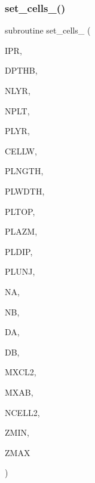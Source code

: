 \mbox{\label{Leroi__c_8f90_a34542cb94b24b37bf99b63f2e3e5e368}} 
\subsubsection{\texorpdfstring{set\+\_\+cells\+\_()}{set\_cells\_1()}}
{\footnotesize\ttfamily subroutine set\+\_\+cells\+\_ (\begin{DoxyParamCaption}\item[{integer}]{I\+PR,  }\item[{real}]{D\+P\+T\+HB,  }\item[{integer}]{N\+L\+YR,  }\item[{integer}]{N\+P\+LT,  }\item[{integer, dimension(nplt)}]{P\+L\+YR,  }\item[{real}]{C\+E\+L\+LW,  }\item[{real, dimension(nplt)}]{P\+L\+N\+G\+TH,  }\item[{real, dimension(nplt)}]{P\+L\+W\+D\+TH,  }\item[{real, dimension(nplt)}]{P\+L\+T\+OP,  }\item[{real, dimension(nplt)}]{P\+L\+A\+ZM,  }\item[{real, dimension(nplt)}]{P\+L\+D\+IP,  }\item[{real, dimension(nplt)}]{P\+L\+U\+NJ,  }\item[{integer, dimension(nplt)}]{NA,  }\item[{integer, dimension(nplt)}]{NB,  }\item[{real, dimension(nplt)}]{DA,  }\item[{real, dimension(nplt)}]{DB,  }\item[{integer}]{M\+X\+C\+L2,  }\item[{integer}]{M\+X\+AB,  }\item[{integer, dimension(0\+:nplt)}]{N\+C\+E\+L\+L2,  }\item[{real}]{Z\+M\+IN,  }\item[{real}]{Z\+M\+AX }\end{DoxyParamCaption})}

